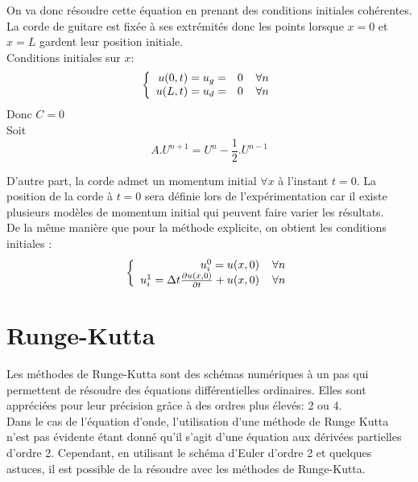 On va donc résoudre cette équation en prenant des conditions initiales cohérentes.\\
La corde de guitare est fixée à ses extrémités donc les points lorsque $x = 0$ et $x = L$ gardent leur position initiale.\\
Conditions initiales sur $x$: 
\begin{equation*}
\left \{
\begin{array}{rcl}
u(0,t) = u_{g} = &0 \hspace*{4 mm} \forall n\\
u(L,t) = u_{d} = &0 \hspace*{4 mm} \forall n\\
\end{array}
\right.
\end{equation*}
Donc $C = 0$\\
Soit
\begin{equation*}
\boxed{
A.U^{n+1} = U^{n} - \frac{1}{2}.U^{n-1}}
\end{equation*}

D'autre part, la corde admet un momentum initial $\forall x$ à l'instant $t=0$. La position de la corde à $t = 0$ sera définie lors de l'expérimentation car il existe plusieurs modèles de momentum initial qui peuvent faire varier les résultats.\\

De la même manière que pour la méthode explicite, on obtient les conditions initiales :
\begin{equation*}
\left \{
\begin{array}{rcl}
u^0_i = u(x,0) \hspace*{4 mm} \forall n\\
u^1_i = \Delta t \frac{\partial u(x,0)}{\partial t} + u(x,0) \hspace*{4 mm} \forall n\\
\end{array}
\right.
\end{equation*}

\section{Runge-Kutta}

Les méthodes de Runge-Kutta sont des schémas numériques à un pas qui permettent de résoudre des équations différentielles ordinaires.
Elles sont appréciées pour leur précision grâce à des ordres plus élevés: 2 ou 4.\\

Dans le cas de l'équation d'onde, l'utilisation d'une méthode de Runge Kutta n'est pas évidente étant donné qu'il s'agit d'une équation aux dérivées partielles d'ordre 2. Cependant, en utilisant le schéma d'Euler d'ordre 2 et quelques astuces, il est possible de la résoudre avec les méthodes de Runge-Kutta.

